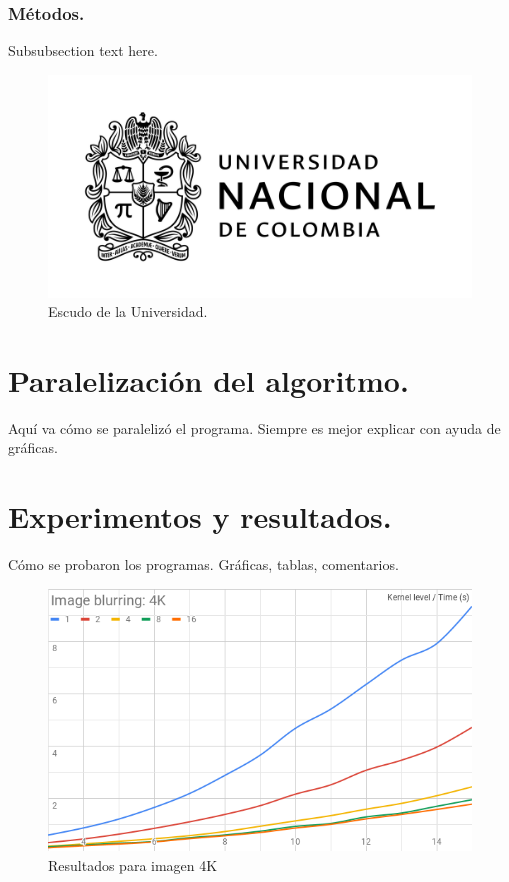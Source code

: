 \documentclass{IEEEtran}
\begin{document}
\subsubsection{Métodos.}
Subsubsection text here.


\begin{figure}[!t]
\centering
\includegraphics[width=\linewidth]{escudo.png}
\caption{Escudo de la Universidad.}
\label{fig_sim}
\end{figure}



\section{Paralelización del algoritmo.}
Aquí va cómo se paralelizó el programa. Siempre es mejor explicar con ayuda de gráficas.



\section{Experimentos y resultados.}
Cómo se probaron los programas. Gráficas, tablas, comentarios.

\begin{figure}[htp]
\centering
\includegraphics[width=\linewidth]{images/4k.png}
\caption{Resultados para imagen 4K}
\label{4kplot}
\end{figure}
\end{document}
